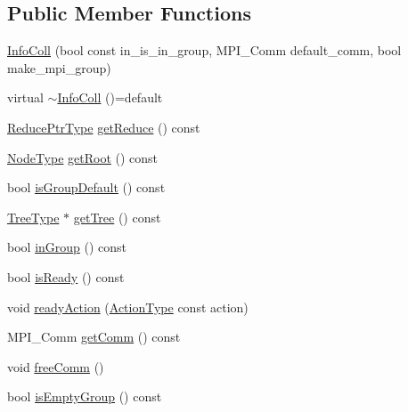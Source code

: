 \subsection*{Public Member Functions}
\begin{DoxyCompactItemize}
\item 
\hyperlink{structvt_1_1group_1_1_info_coll_a1181dfe3d01399d8e903d700461d2d7f}{Info\+Coll} (bool const in\+\_\+is\+\_\+in\+\_\+group, M\+P\+I\+\_\+\+Comm default\+\_\+comm, bool make\+\_\+mpi\+\_\+group)
\item 
virtual \hyperlink{structvt_1_1group_1_1_info_coll_aa8d78933115646b19f26f96c6a44e89b}{$\sim$\+Info\+Coll} ()=default
\item 
\hyperlink{structvt_1_1group_1_1_info_coll_a1b9fe0214f622ed9e8987531f44ef1fa}{Reduce\+Ptr\+Type} \hyperlink{structvt_1_1group_1_1_info_coll_a297cafe0cae350b83a677db585865e62}{get\+Reduce} () const
\item 
\hyperlink{namespacevt_a866da9d0efc19c0a1ce79e9e492f47e2}{Node\+Type} \hyperlink{structvt_1_1group_1_1_info_coll_a5724786f46add3ccf7ca081774609f0c}{get\+Root} () const
\item 
bool \hyperlink{structvt_1_1group_1_1_info_coll_a6adf605b8d46a4174a8fd1321fd8fd3f}{is\+Group\+Default} () const
\item 
\hyperlink{structvt_1_1group_1_1_info_base_a96e01b6097ed7b2bc299027d0a7a1b1e}{Tree\+Type} $\ast$ \hyperlink{structvt_1_1group_1_1_info_coll_a2e7551dd6e85e5f3a6a7907b70f040c4}{get\+Tree} () const
\item 
bool \hyperlink{structvt_1_1group_1_1_info_coll_a09abdfe4684a0d7997441a97756ea237}{in\+Group} () const
\item 
bool \hyperlink{structvt_1_1group_1_1_info_coll_aec831cf27c5e2492657c5a2209718ae0}{is\+Ready} () const
\item 
void \hyperlink{structvt_1_1group_1_1_info_coll_ad2eb5a689e4b035e51a0a7db9fffd488}{ready\+Action} (\hyperlink{namespacevt_ae0a5a7b18cc99d7b732cb4d44f46b0f3}{Action\+Type} const action)
\item 
M\+P\+I\+\_\+\+Comm \hyperlink{structvt_1_1group_1_1_info_coll_a9f9dfa148d52cdc913fbaf1398f1fb48}{get\+Comm} () const
\item 
void \hyperlink{structvt_1_1group_1_1_info_coll_a0461bfa4ce243b30df15e82f01195ad7}{free\+Comm} ()
\item 
bool \hyperlink{structvt_1_1group_1_1_info_coll_aac6d23631b03488d45b95448b2a1e391}{is\+Empty\+Group} () const
\end{DoxyCompactItemize}
